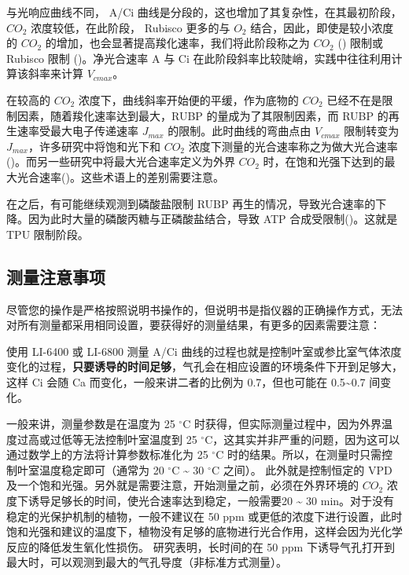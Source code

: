 \documentclass[
]{krantz}
\begin{document}
与光响应曲线不同， A/Ci 曲线是分段的，这也增加了其复杂性，在其最初阶段，\(CO_2\) 浓度较低，在此阶段， Rubisco 更多的与 \(O_2\) 结合，因此，即使是较小浓度的 \(CO_2\) 的增加，也会显著提高羧化速率，我们将此阶段称之为 \(CO_2\) (\citet{Wullschleger1993Biochemical}) 限制或 Rubisco 限制 (\citet{Long2003Gas})。净光合速率 A 与 Ci 在此阶段斜率比较陡峭，实践中往往利用计算该斜率来计算 \(V_{cmax}\)。

在较高的 \(CO_2\) 浓度下，曲线斜率开始便的平缓，作为底物的 \(CO_2\) 已经不在是限制因素，随着羧化速率达到最大，RUBP 的量成为了其限制因素，而 RUBP 的再生速率受最大电子传递速率 \(J_{max}\) 的限制。此时曲线的弯曲点由 \(V_{cmax}\) 限制转变为 \(J_{max}\)，许多研究中将饱和光下和 \(CO_2\) 浓度下测量的光合速率称之为做大光合速率(\citet{heath2005rising})。而另一些研究中将最大光合速率定义为外界 \(CO_2\) 时，在饱和光强下达到的最大光合速率(\citet{marshall1980a})。这些术语上的差别需要注意。

在之后，有可能继续观测到磷酸盐限制 RUBP 再生的情况，导致光合速率的下降。因为此时大量的磷酸丙糖与正磷酸盐结合，导致 ATP 合成受限制(\citet{ellsworth2015phosphorus})。这就是 TPU 限制阶段。

\hypertarget{note_detail}{%
\subsection{测量注意事项}\label{note_detail}}

尽管您的操作是严格按照说明书操作的，但说明书是指仪器的正确操作方式，无法对所有测量都采用相同设置，要获得好的测量结果，有更多的因素需要注意：

使用 LI-6400 或 LI-6800 测量 A/Ci 曲线的过程也就是控制叶室或参比室气体浓度变化的过程，\textbf{只要诱导的时间足够}，气孔会在相应设置的环境条件下开到足够大，这样 Ci 会随 Ca 而变化，一般来讲二者的比例为 0.7，但也可能在 0.5\textasciitilde{}0.7 间变化。

一般来讲，测量参数是在温度为 25 \(^{\circ}\)C 时获得，但实际测量过程中，因为外界温度过高或过低等无法控制叶室温度到 25 \(^{\circ}\)C，这其实并非严重的问题，因为这可以通过数学上的方法将计算参数标准化为 25 \(^{\circ}\)C 时的结果。所以，在测量时只需控制叶室温度稳定即可（通常为 20 \(^{\circ}\)C \textasciitilde{} 30 \(^{\circ}\)C 之间）。 此外就是控制恒定的 VPD 及一个饱和光强。另外就是需要注意，开始测量之前，必须在外界环境的 \(CO_2\) 浓度下诱导足够长的时间，使光合速率达到稳定，一般需要20 \textasciitilde{} 30 min。对于没有稳定的光保护机制的植物，一般不建议在 50 ppm 或更低的浓度下进行设置，此时饱和光强和建议的温度下，植物没有足够的底物进行光合作用，这样会因为光化学反应的降低发生氧化性损伤。\citet{centritto2003} 研究表明，长时间的在 50 ppm 下诱导气孔打开到最大时，可以观测到最大的气孔导度（非标准方式测量）。
\end{document}

